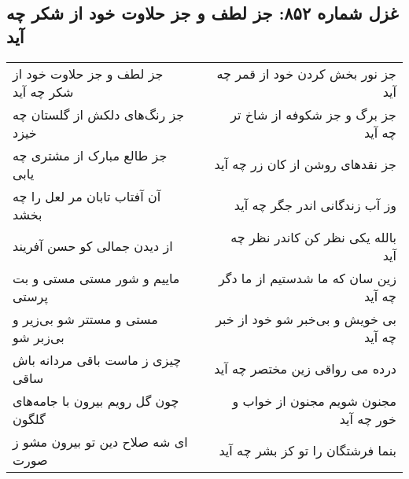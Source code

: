 \begin{center}
\section*{غزل شماره ۸۵۲: جز لطف و جز حلاوت خود از شکر چه آید}
\label{sec:0852}
\begin{longtable}{l p{0.5cm} r}
جز لطف و جز حلاوت خود از شکر چه آید
&&
جز نور بخش کردن خود از قمر چه آید
\\
جز رنگ‌های دلکش از گلستان چه خیزد
&&
جز برگ و جز شکوفه از شاخ تر چه آید
\\
جز طالع مبارک از مشتری چه یابی
&&
جز نقدهای روشن از کان زر چه آید
\\
آن آفتاب تابان مر لعل را چه بخشد
&&
وز آب زندگانی اندر جگر چه آید
\\
از دیدن جمالی کو حسن آفریند
&&
بالله یکی نظر کن کاندر نظر چه آید
\\
ماییم و شور مستی مستی و بت پرستی
&&
زین سان که ما شدستیم از ما دگر چه آید
\\
مستی و مستتر شو بی‌زیر و بی‌زبر شو
&&
بی خویش و بی‌خبر شو خود از خبر چه آید
\\
چیزی ز ماست باقی مردانه باش ساقی
&&
درده می رواقی زین مختصر چه آید
\\
چون گل رویم بیرون با جامه‌های گلگون
&&
مجنون شویم مجنون از خواب و خور چه آید
\\
ای شه صلاح دین تو بیرون مشو ز صورت
&&
بنما فرشتگان را تو کز بشر چه آید
\\
\end{longtable}
\end{center}

